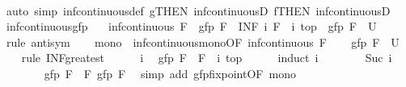 \begin{isabellebody}
\ \ \ \ \isamarkupfalse%
\ {\isacharparenleft}auto\ simp{\isacharcolon}\ inf{\isacharunderscore}continuous{\isacharunderscore}def\ g{\isacharbrackleft}THEN\ inf{\isacharunderscore}continuousD{\isacharbrackright}\ f{\isacharbrackleft}THEN\ inf{\isacharunderscore}continuousD{\isacharbrackright}{\isacharparenright}\isanewline
{}\isamarkupfalse%
%
\endisatagproof
{\isafoldproof}%
%
\isadelimproof
\isanewline
%
\endisadelimproof
\isanewline
{}\isamarkupfalse%
\ inf{\isacharunderscore}continuous{\isacharunderscore}gfp{\isacharcolon}\isanewline
\ \ \ {\isachardoublequoteopen}inf{\isacharunderscore}continuous\ F{\isachardoublequoteclose}\ \ {\isachardoublequoteopen}gfp\ F\ {\isacharequal}\ {\isacharparenleft}INF\ i{\isachardot}\ {\isacharparenleft}F\ {\isacharcircum}{\isacharcircum}\ i{\isacharparenright}\ top{\isacharparenright}{\isachardoublequoteclose}\ {\isacharparenleft}\ {\isachardoublequoteopen}gfp\ F\ {\isacharequal}\ {\isacharquery}U{\isachardoublequoteclose}{\isacharparenright}\isanewline
%
\isadelimproof
%
\endisadelimproof
%
\isatagproof
{}\isamarkupfalse%
\ {\isacharparenleft}rule\ antisym{\isacharparenright}\isanewline
\ \ \isamarkupfalse%
\ mono\ {\isacharequal}\ inf{\isacharunderscore}continuous{\isacharunderscore}mono{\isacharbrackleft}OF\ {\isacartoucheopen}inf{\isacharunderscore}continuous\ F{\isacartoucheclose}{\isacharbrackright}\isanewline
\ \ \isamarkupfalse%
\ {\isachardoublequoteopen}gfp\ F\ {\isasymle}\ {\isacharquery}U{\isachardoublequoteclose}\isanewline
\ \ \isamarkupfalse%
\ {\isacharparenleft}rule\ INF{\isacharunderscore}greatest{\isacharparenright}\isanewline
\ \ \ \ \isamarkupfalse%
\ i\ \isamarkupfalse%
\ {\isachardoublequoteopen}gfp\ F\ {\isasymle}\ {\isacharparenleft}F\ {\isacharcircum}{\isacharcircum}\ i{\isacharparenright}\ top{\isachardoublequoteclose}\isanewline
\ \ \ \ \isamarkupfalse%
\ {\isacharparenleft}induct\ i{\isacharparenright}\isanewline
\ \ \ \ \ \ \isamarkupfalse%
\ {\isacharparenleft}Suc\ i{\isacharparenright}\isanewline
\ \ \ \ \ \ \isamarkupfalse%
\ {\isachardoublequoteopen}gfp\ F\ {\isacharequal}\ F\ {\isacharparenleft}gfp\ F{\isacharparenright}{\isachardoublequoteclose}\ \isamarkupfalse%
\ {\isacharparenleft}simp\ add{\isacharcolon}\ gfp{\isacharunderscore}fixpoint{\isacharbrackleft}OF\ mono{\isacharbrackright}{\isacharparenright}\isanewline
\ \ \ \ \ \ \isamarkupfalse%

\end{isabellebody}
